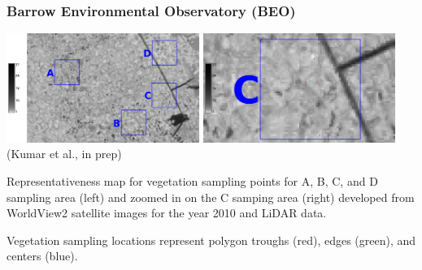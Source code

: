 \begin{frame}
 \frametitle{Barrow Environmental Observatory (BEO)}
 \includegraphics[width=0.47\textwidth]{beo_figures/ABCDv2.png}
 \hfill
 \includegraphics[width=0.47\textwidth]{beo_figures/Cv2.png} \\
 \vbox{\scriptsize\hfill (Kumar et al., in prep)}

\medskip
Representativeness map for vegetation sampling points for A, B, C, and D
sampling area (left) and zoomed in on the C samping area (right) developed
from WorldView2 satellite images for the year 2010 and LiDAR data.

\medskip
Vegetation sampling locations represent polygon troughs (red), edges
(green), and centers (blue).

\end{frame}

